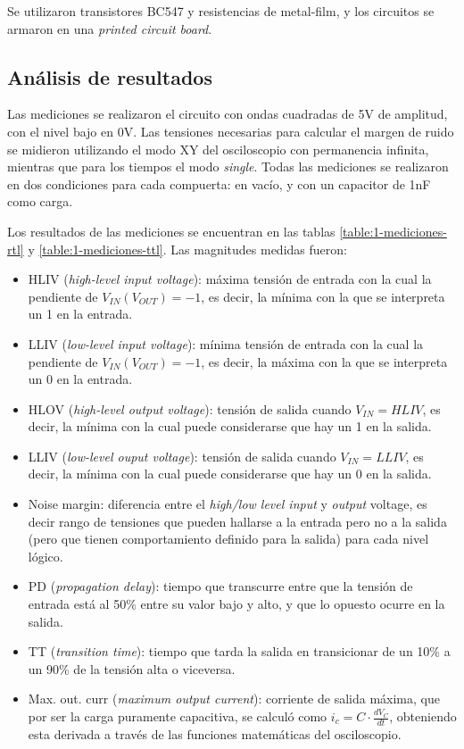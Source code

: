 \documentclass[../../e3_tp2_main.tex]{subfiles}
\begin{document}
Se utilizaron transistores BC547 y resistencias de metal-film, y los circuitos se armaron en una \textit{printed circuit board}. \par

\subsection{An\'alisis de resultados}

Las mediciones se realizaron el circuito con ondas cuadradas de 5V de amplitud, con el nivel bajo en 0V. Las tensiones necesarias para calcular el margen de ruido se midieron utilizando el modo XY del osciloscopio con permanencia infinita, mientras que para los tiempos el modo \textit{single}. Todas las mediciones se realizaron en dos condiciones para cada compuerta: en vac\'io, y con un capacitor de 1nF como carga.\par

Los resultados de las mediciones se encuentran en las tablas \ref{table:1-mediciones-rtl} y \ref{table:1-mediciones-ttl}. Las magnitudes medidas fueron:

\begin{itemize}
	\item HLIV (\textit{high-level input voltage}): m\'axima tensi\'on de entrada con la cual la pendiente de $V_{IN}(V_{OUT})=-1$, es decir, la m\'inima con la que se interpreta un 1 en la entrada.
	\item LLIV (\textit{low-level input voltage}): m\'inima tensi\'on de entrada con la cual la pendiente de $V_{IN}(V_{OUT})=-1$, es decir, la m\'axima con la que se interpreta un 0 en la entrada.
	\item HLOV (\textit{high-level output voltage}): tensi\'on de salida cuando $V_{IN}=HLIV$, es decir, la m\'inima con la cual puede considerarse que hay un 1 en la salida.
	\item LLIV (\textit{low-level ouput voltage}): tensi\'on de salida cuando $V_{IN}=LLIV$, es decir, la m\'inima con la cual puede considerarse que hay un 0 en la salida.
	\item Noise margin: diferencia entre el \textit{high/low level input} y \textit{output} voltage, es decir rango de tensiones que pueden hallarse a la entrada pero no a la salida (pero que tienen comportamiento definido para la salida) para cada nivel l\'ogico. 
	\item PD (\textit{propagation delay}): tiempo que transcurre entre que la tensi\'on de entrada est\'a al 50\% entre su valor bajo y alto, y que lo opuesto ocurre en la salida.
	\item TT (\textit{transition time}): tiempo que tarda la salida en transicionar de un 10\% a un 90\% de la tensi\'on alta o viceversa.
	\item Max. out. curr (\textit{maximum output current}): corriente de salida m\'axima, que por ser la carga puramente capacitiva, se calcul\'o como $i_c = C \cdot \frac{dV_C}{dt}$, obteniendo esta derivada a trav\'es de las funciones matem\'aticas del osciloscopio. \par
\end{itemize}
\end{document}
